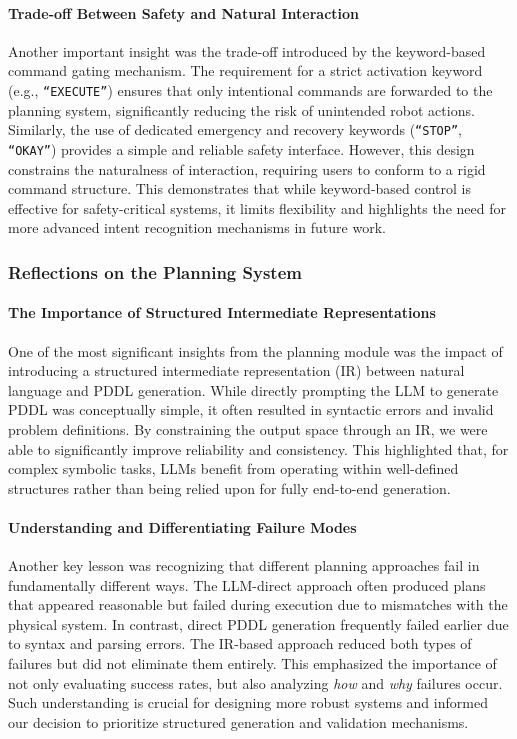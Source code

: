 \documentclass[12pt]{extarticle}
\begin{document}
\paragraph{Trade-off Between Safety and Natural Interaction}
Another important insight was the trade-off introduced by the keyword-based command gating mechanism. The requirement for a strict activation keyword (e.g., \texttt{``EXECUTE''}) ensures that only intentional commands are forwarded to the planning system, significantly reducing the risk of unintended robot actions. Similarly, the use of dedicated emergency and recovery keywords (\texttt{``STOP''}, \texttt{``OKAY''}) provides a simple and reliable safety interface. However, this design constrains the naturalness of interaction, requiring users to conform to a rigid command structure. This demonstrates that while keyword-based control is effective for safety-critical systems, it limits flexibility and highlights the need for more advanced intent recognition mechanisms in future work.


\subsubsection{Reflections on the Planning System}

\paragraph{The Importance of Structured Intermediate Representations}
One of the most significant insights from the planning module was the impact of introducing a structured intermediate representation (IR) between natural language and PDDL generation. While directly prompting the LLM to generate PDDL was conceptually simple, it often resulted in syntactic errors and invalid problem definitions. By constraining the output space through an IR, we were able to significantly improve reliability and consistency. This highlighted that, for complex symbolic tasks, LLMs benefit from operating within well-defined structures rather than being relied upon for fully end-to-end generation.

\paragraph{Understanding and Differentiating Failure Modes}
Another key lesson was recognizing that different planning approaches fail in fundamentally different ways. The LLM-direct approach often produced plans that appeared reasonable but failed during execution due to mismatches with the physical system. In contrast, direct PDDL generation frequently failed earlier due to syntax and parsing errors. The IR-based approach reduced both types of failures but did not eliminate them entirely. This emphasized the importance of not only evaluating success rates, but also analyzing \textit{how} and \textit{why} failures occur. Such understanding is crucial for designing more robust systems and informed our decision to prioritize structured generation and validation mechanisms.
\end{document}
